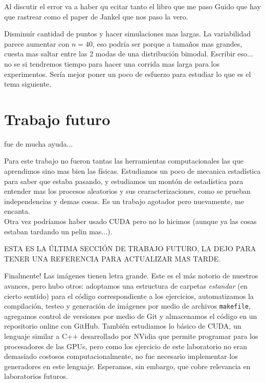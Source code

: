 \documentclass[a4paper,12pt]{article}
\begin{document}
Al discutir el error va a haber qu ecitar tanto el libro que me paso Guido que hay que rastrear como el paper de Jankel que nos paso la vero.

Disminuír cantidad de puntos y hacer simulaciones mas largas. La variabilidad parece aumentar con $n = 40$, eso podría ser porque a tamaños mas grandes, cuesta mas saltar entre las 2 modas de una distribución bimodal. Escribir eso... no se si tendremos tiempo para hacer una corrida mas larga para los experimentos. Sería mejor poner un poco de esfuerzo para estudiar lo que es el tema siguiente.


\section{Trabajo futuro}

\cite{phillies2000elementary} fue de mucha ayuda...


Para este trabajo no fueron tantas las herramientas computacionales las que aprendimos sino mas bien las físicas. Estudiamos un poco de mecanica estadística para saber que estaba pasando, y estudiamos un montón de estadística para entender mas los procesos aleatorios y sus cearacterizaciones, como se prueban independencias y demas cosas. Es un trabajo agotador pero nuevamente, me encanta.\\

Otra vez podríamos haber usado CUDA pero no lo hicimos (aunque ya las cosas estaban tardando un pelin mas...).


ESTA ES LA ÚLTIMA SECCIÓN DE TRABAJO FUTURO, LA DEJO PARA TENER UNA REFERENCIA PARA ACTUALIZAR MAS TARDE.

Finalmente! Las imágenes tienen letra grande. Este es el más notorio de nuestros avances, pero hubo otros: adoptamos una estructura de carpetas {\it estandar} (en cierto sentido) para el código correspondiente a los ejercicios, automatizamos la compilación, testeo y generación de imágenes por medio de archivos \verb|makefile|, agregamos control de versiones por medio de Git y almacenamos el código en un repositorio online con GitHub. También estudiamos lo básico de CUDA, un lenguaje similar a C++ desarrollado por NVidia que permite programar para los procesadores de las GPUs, pero como los ejercicio de este laboratorio no eran demasiado costosos computacionalmente, no fue necesario implementar los generadores en este lenguaje. Esperamos, sin embargo, que cobre relevancia en laboratorios futuros.\\
\end{document}
